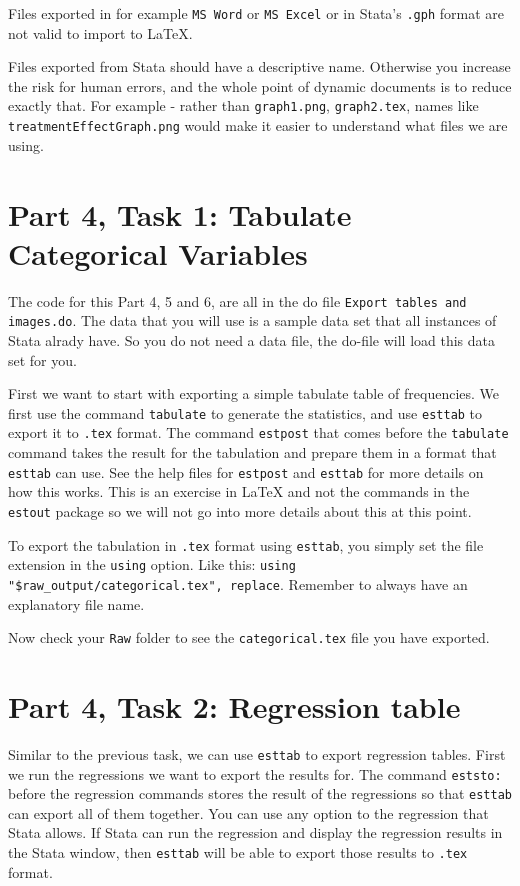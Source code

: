 \documentclass[]{article}
\begin{document}
Files exported in for example \texttt{MS Word} or \texttt{MS Excel} or in Stata's \texttt{.gph} format are not valid to import to {\LaTeX}.

Files exported from Stata should have a descriptive name. Otherwise you increase the risk for human errors, and the whole point of dynamic documents is to reduce exactly that. For example - rather than \texttt{graph1.png}, \texttt{graph2.tex}, names like \texttt{treatmentEffectGraph.png} would make it easier to understand what files we are using.

\section*{Part 4, Task 1: Tabulate Categorical Variables}

The code for this Part 4, 5 and 6, are all in the do file \texttt{Export tables and images.do}. The data that you will use is a sample data set that all instances of Stata alrady have. So you do not need a data file, the do-file will load this data set for you.

First we want to start with exporting a simple tabulate table of frequencies. We first use the command \texttt{tabulate} to generate the statistics, and use \texttt{esttab} to export it to \texttt{.tex} format. The command \texttt{estpost} that comes before the \texttt{tabulate} command takes the result for the tabulation and prepare them in a format that \texttt{esttab} can use. See the help files for \texttt{estpost} and \texttt{esttab} for more details on how this works. This is an exercise in {\LaTeX} and not the commands in the \texttt{estout} package so we will not go into more details about this at this point. 

To export the tabulation in \texttt{.tex} format using \texttt{esttab}, you simply set the file extension in the \texttt{using} option. Like this: \verb|using "$raw_output/categorical.tex", replace|. Remember to always have an explanatory file name.

Now check your \texttt{Raw} folder to see the \texttt{categorical.tex} file you have exported.

\section*{Part 4, Task 2: Regression table}

Similar to the previous task, we can use \texttt{esttab} to export regression tables. First we run the regressions we want to export the results for. The command \texttt{eststo:} before the regression commands stores the result of the regressions so that \texttt{esttab} can export all of them together. You can use any option to the regression that Stata allows. If Stata can run the regression and display the regression results in the Stata window, then \texttt{esttab} will be able to export those results to \texttt{.tex} format.
\end{document}
